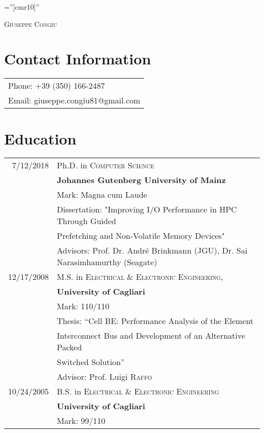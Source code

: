 \documentclass[a4paper,10pt]{article}
\begin{document}
\pagestyle{empty} %

\font\fb=''[cmr10]'' %

\par{\centering
    {\Huge \textsc{Giuseppe Congiu}
}\bigskip\par}

\section{Contact Information}

\begin{tabular}{l}
    Phone: +39 (350) 166-2487\\
    Email: giuseppe.congiu81@gmail.com\\
\end{tabular}

\section{Education}
\begin{tabular}{rp{11cm}}
\textsc{7/12/2018} & Ph.D. in \textsc{Computer Science}\\
          & \textbf{Johannes Gutenberg University of Mainz}\\
          & Mark: Magna cum Laude\\
          & Dissertation: "Improving I/O Performance in HPC Through Guided\\
          & Prefetching and Non-Volatile Memory Devices"\\
          & \small Advisors: Prof. Dr. Andr\'e Brinkmann (JGU), Dr. Sai Narasimhamurthy (Seagate)\\

\textsc{12/17/2008} & M.S. in \textsc{Electrical \& Electronic Engineering},\\
          & \textbf{University of Cagliari}\\
          & Mark: 110/110\\
          & Thesis: ``Cell BE: Performance Analysis of the Element\\
          & Interconnect Bus and Development of an Alternative Packed\\
          & Switched Solution''\\
          & \small Advisor: Prof. Luigi \textsc{Raffo}\\

\textsc{10/24/2005} & B.S. in \textsc{Electrical \& Electronic Engineering} \\
          & \textbf{University of Cagliari}\\
          & Mark: 99/110\\
\end{tabular}
\end{document}

